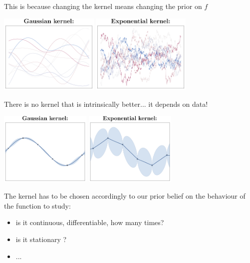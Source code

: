 \begin{frame}{}
This is because changing the kernel means changing the prior on $f$\\
\vspace{5mm}
\begin{center}
\includegraphics[height=3.8cm]{1_stat_models/figures/Fig2-sim-rbf} \qquad
\includegraphics[height=3.8cm]{1_stat_models/figures/Fig2-sim-exp}
\end{center}
\end{frame}

\begin{frame}{}
There is no kernel that is intrinsically better... it depends on data!
\begin{center}
\includegraphics[height=3.5cm]{1_stat_models/figures/Fig2-GP-rbf} \hspace{1cm}
\includegraphics[height=3.5cm]{1_stat_models/figures/Fig2-GP-exp}
\end{center}
The kernel has to be chosen accordingly to our prior belief on the behaviour of the function to study:
\begin{itemize}
  \item is it continuous, differentiable, how many times?
  \item is it stationary ?
  \item ...
\end{itemize}
\end{frame}

